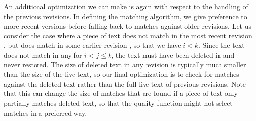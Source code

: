 An additional optimization we can make is again with respect to the
handling of the previous revisions.
In defining the matching algorithm, we give preference to more recent
versions before falling back to matches against older revisions.
Let us consider the case where a piece of text does not match in the
most recent revision ,
but does match in some earlier revision , so that we have $i < k$.
Since the text does not match in any  for $i < j \le k$,
the text must have been deleted in  and
never restored.
The size of deleted text in any revision is typically much smaller
than the size of the live text, so our final optimization is
to check for matches against the deleted text rather than the full
live text of previous revisions.
Note that this can change the size of matches that are found
if a piece of text only partially matches deleted text,
so that the quality function might not select matches in a preferred way.

